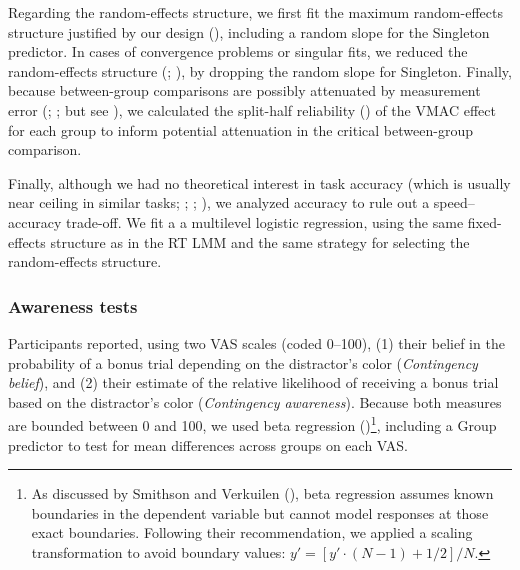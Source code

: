 \documentclass[
  man,
  floatsintext,
  longtable,
  nolmodern,
  notxfonts,
  notimes,
  mask,
  colorlinks=true,linkcolor=blue,citecolor=blue,urlcolor=blue]{apa7}
\begin{document}
Regarding the random-effects structure, we first fit the maximum
random-effects structure justified by our design
(), including a random slope
for the Singleton predictor. In cases of convergence problems or
singular fits, we reduced the random-effects structure
(;
), by dropping the
random slope for Singleton. Finally, because between-group comparisons
are possibly attenuated by measurement error
(;
; but see
), we calculated the split-half
reliability () of the VMAC
effect for each group to inform potential attenuation in the critical
between-group comparison.

Finally, although we had no theoretical interest in task accuracy (which
is usually near ceiling in similar tasks;
;
;
), we
analyzed accuracy to rule out a speed--accuracy trade-off. We fit a a
multilevel logistic regression, using the same fixed-effects structure
as in the RT LMM and the same strategy for selecting the random-effects
structure.

\subsubsection{Awareness tests}\label{awareness-tests}

Participants reported, using two VAS scales (coded 0--100), (1) their
belief in the probability of a bonus trial depending on the distractor's
color (\emph{Contingency belief}), and (2) their estimate of the
relative likelihood of receiving a bonus trial based on the distractor's
color (\emph{Contingency awareness}). Because both measures are bounded
between 0 and 100, we used beta regression
()\footnote{As
  discussed by Smithson and Verkuilen
  (), beta regression assumes known
  boundaries in the dependent variable but cannot model responses at
  those exact boundaries. Following their recommendation, we applied a
  scaling transformation to avoid boundary values:
  \(y' = [y' \cdot (N - 1) + 1/2] / N\).}, including a Group predictor
to test for mean differences across groups on each VAS.
\end{document}
